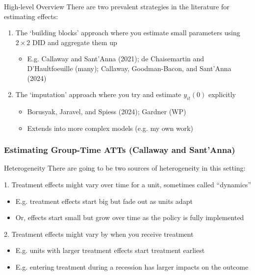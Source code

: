 \documentclass[aspectratio=169,t,11pt,table]{beamer}
\begin{document}
\begin{frame}{High-level Overview}
  There are two prevalent strategies in the literature for estimating effects:
  
  \bigskip
  \begin{enumerate}
    \item The `building blocks' approach where you estimate small parameters using $2 \times 2$ DID and aggregate them up
    \begin{itemize}
      \item E.g. Callaway and Sant'Anna (2021); de Chaisemartin and D'Haultfoeuille (many); Callaway, Goodman-Bacon, and Sant'Anna (2024)
    \end{itemize}

    \bigskip
    \item The `imputation' approach where you try and estimate $y_{it}(0)$ explicitly
    \begin{itemize}
      \item Borusyak, Jaravel, and Spiess (2024); Gardner (WP)
      \item Extends into more complex models (e.g. my own work)
    \end{itemize}
  \end{enumerate}
\end{frame}

\subsubsection{Estimating Group-Time ATTs (Callaway and Sant'Anna)}

\begin{frame}{Heterogeneity}
  There are going to be two sources of heterogeneity in this setting:

  \bigskip
  \alert{1.} Treatment effects might vary over time for a unit, sometimes called ``dynamics''
  \begin{itemize}
    \item E.g. treatment effects start big but fade out as units adapt
    \item Or, effects start small but grow over time as the policy is fully implemented
  \end{itemize}

  \bigskip
  \alert{2.} Treatment effects might vary by when you receive treatment
  \begin{itemize}
    \item E.g. units with larger treatment effects start treatment earliest 
    
    \item E.g. entering treatment during a recession has larger impacts on the outcome
  \end{itemize}
\end{frame}
\end{document}
